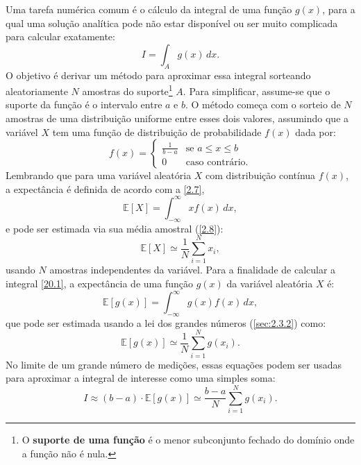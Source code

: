 Uma tarefa numérica comum é o cálculo da integral de uma função $ g(x) $, para a qual uma solução analítica pode não estar disponível ou ser muito complicada para calcular exatamente:
\begin{equation}\label{20.1}
I = \int_A g(x) \, dx.
\end{equation}
O objetivo é derivar um método para aproximar essa integral sorteando aleatoriamente $ N $ amostras do suporte\footnote{O \textbf{suporte de uma função} é o menor subconjunto fechado do domínio onde a função não é nula.} $ A $. Para simplificar, assume-se que o suporte da função é o intervalo entre $ a $ e $ b $. O método começa com o sorteio de $ N $ amostras de uma distribuição uniforme entre esses dois valores, assumindo que a variável $ X $ tem uma função de distribuição de probabilidade $ f(x) $ dada por:
\begin{equation}
f(x) = \begin{cases} 
	\frac{1}{b - a} & \text{se } a \leq x \leq b \\
	0 & \text{caso contrário}.
\end{cases}
\end{equation}
Lembrando que para uma variável aleatória $ X $ com distribuição contínua $ f(x) $, a expectância é definida de acordo com a \autoref{2.7},
\begin{equation*}
\mathbb{E}[X] = \int_{-\infty}^{\infty} x f(x) \, dx,
\end{equation*}
e pode ser estimada via sua média amostral (\autoref{2.8}):
\begin{equation*}
\mathbb{E}[X] \simeq \dfrac{1}{N} \sum_{i=1}^N x_i,
\end{equation*}
usando $ N $ amostras independentes da variável. Para a finalidade de calcular a integral \eqref{20.1}, a expectância de uma função $ g(x) $ da variável aleatória $ X $ é:
\begin{equation*}
	\mathbb{E}[g(x)] = \int_{-\infty}^{\infty} g(x) f(x) \, dx,
\end{equation*}
que pode ser estimada usando a lei dos grandes números (\autoref{sec:2.3.2}) como:
\begin{equation}
	\mathbb{E}[g(x)] \simeq \dfrac{1}{N} \sum_{i=1}^N g(x_i).
\end{equation}
No limite de um grande número de medições, essas equações podem ser usadas para aproximar a integral de interesse como uma simples soma:
\begin{equation}\label{20.4}
I \approx (b - a) \cdot \mathbb{E}[g(x)] \simeq \dfrac{b - a}{N} \sum_{i=1}^N g(x_i).
\end{equation}
